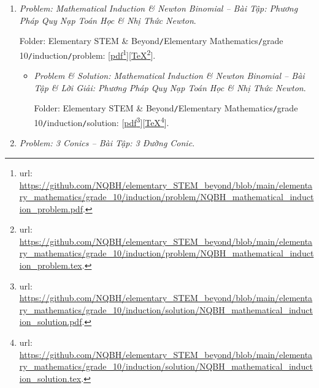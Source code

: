 \documentclass[12pt]{article}
\begin{document}
\begin{enumerate}
\begin{itemize}
		Folder: {\sf Elementary STEM \& Beyond{\tt/}Elementary Mathematics{\tt/}grade 10{\tt/}2D method of coordinate{\tt/}solution}: [\href{https://github.com/NQBH/elementary_STEM_beyond/blob/main/elementary_mathematics/grade_10/2D_method_coordinate/solution/NQBH_2D_method_coordinate_solution.pdf}{pdf}\footnote{{\sc url}: \url{https://github.com/NQBH/elementary_STEM_beyond/blob/main/elementary_mathematics/grade_10/2D_method_coordinate/solution/NQBH_2D_method_coordinate_solution.pdf}.}][\href{https://github.com/NQBH/elementary_STEM_beyond/blob/main/elementary_mathematics/grade_10/2D_method_coordinate/solution/NQBH_2D_method_coordinate_solution.tex}{\TeX}\footnote{{\sc url}: \url{https://github.com/NQBH/elementary_STEM_beyond/blob/main/elementary_mathematics/grade_10/2D_method_coordinate/solution/NQBH_2D_method_coordinate_solution.tex}.}].
	\end{itemize}
	\item {\it Problem: Mathematical Induction \& Newton Binomial -- Bài Tập: Phương Pháp Quy Nạp Toán Học \& Nhị Thức Newton}.
	
	Folder: {\sf Elementary STEM \& Beyond{\tt/}Elementary Mathematics{\tt/}grade 10{\tt/}induction{\tt/}problem}: [\href{https://github.com/NQBH/elementary_STEM_beyond/blob/main/elementary_mathematics/grade_10/induction/problem/NQBH_mathematical_induction_problem.pdf}{pdf}\footnote{{\sc url}: \url{https://github.com/NQBH/elementary_STEM_beyond/blob/main/elementary_mathematics/grade_10/induction/problem/NQBH_mathematical_induction_problem.pdf}.}][\href{https://github.com/NQBH/elementary_STEM_beyond/blob/main/elementary_mathematics/grade_10/induction/problem/NQBH_mathematical_induction_problem.tex}{\TeX}\footnote{{\sc url}: \url{https://github.com/NQBH/elementary_STEM_beyond/blob/main/elementary_mathematics/grade_10/induction/problem/NQBH_mathematical_induction_problem.tex}.}].
	\begin{itemize}
		\item {\it Problem \& Solution: Mathematical Induction \& Newton Binomial -- Bài Tập \& Lời Giải: Phương Pháp Quy Nạp Toán Học \& Nhị Thức Newton}.
		
		Folder: {\sf Elementary STEM \& Beyond{\tt/}Elementary Mathematics{\tt/}grade 10{\tt/}induction{\tt/}solution}: [\href{https://github.com/NQBH/elementary_STEM_beyond/blob/main/elementary_mathematics/grade_10/induction/solution/NQBH_mathematical_induction_solution.pdf}{pdf}\footnote{{\sc url}: \url{https://github.com/NQBH/elementary_STEM_beyond/blob/main/elementary_mathematics/grade_10/induction/solution/NQBH_mathematical_induction_solution.pdf}.}][\href{https://github.com/NQBH/elementary_STEM_beyond/blob/main/elementary_mathematics/grade_10/induction/solution/NQBH_mathematical_induction_solution.tex}{\TeX}\footnote{{\sc url}: \url{https://github.com/NQBH/elementary_STEM_beyond/blob/main/elementary_mathematics/grade_10/induction/solution/NQBH_mathematical_induction_solution.tex}.}].
	\end{itemize}
	\item {\it Problem: 3 Conics -- Bài Tập: 3 Đường Conic}.
	

\end{enumerate}
\end{document}
